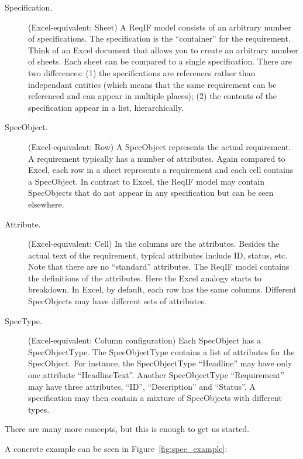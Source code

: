 \begin{description}
  \item[Specification.] (Excel-equivalent: Sheet) A ReqIF model consists of an arbitrary number of specifications.  The specification is the ``container'' for the requirement.  Think of an Excel document that allows you to create an arbitrary number of sheets.  Each sheet can be compared to a single specification.  There are two differences: (1) the specifications are references rather than independant entities (which means that the same requirement can be referenced and can appear in multiple places); (2) the contents of the specification appear in a list, hierarchically.

  \item[SpecObject.] (Excel-equivalent: Row) A SpecObject represents the actual requirement.  A requirement typically has a number of attributes.  Again compared to Excel, each row in a sheet represents a requirement and each cell contains a SpecObject.  In contrast to Excel, the ReqIF model may contain SpecObjects that do not appear in any specification but can be seen elsewhere.

  \item[Attribute.] (Excel-equivalent: Cell) In the columns are the attributes. Besides the actual text of the requirement, typical attributes include ID, status, etc.  Note that there are no ``standard'' attributes.  The ReqIF model contains the definitions of the attributes.  Here the Excel analogy starts to breakdown.  In Excel, by default, each row has the same columns.  Different SpecObjects may have different sets of attributes.

  \item[SpecType.] (Excel-equivalent: Column configuration) Each SpecObject has a SpecObjectType.  The SpecObjectType contains a list of attributes for the SpecObject.  For instance, the SpecObjectType ``Headline'' may have only one attribute ``HeadlineText''.  Another SpecObjectType ``Requirement'' may have three attributes, ``ID'', ``Description'' and ``Status''.  A specification may then contain a mixture of SpecObjects with different types.

\end{description}

There are many more concepts, but this is enough to get us started.

A concrete example can be seen in Figure~\ref{fig:spec_example}:

